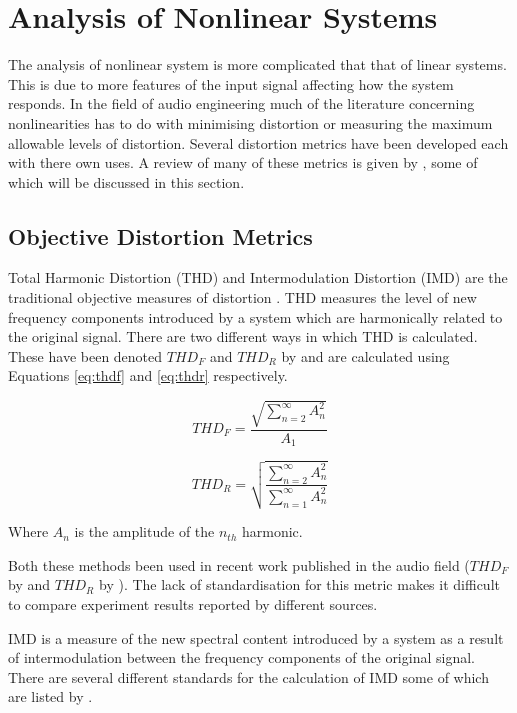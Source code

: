 \section{Analysis of Nonlinear Systems}
\label{sec:Excitation-AnalysisOfNonlinearSystems}
	The analysis of nonlinear system is more complicated that that of linear systems. This is due to more features of
	the input signal affecting how the system responds. In the field of audio engineering much of the literature
	concerning nonlinearities has to do with minimising distortion or measuring the maximum allowable levels of
	distortion. Several distortion metrics have been developed each with there own uses. A review of many of these
	metrics is given by \cite{voishvillo2006assessment}, some of which will be discussed in this section.

	\subsection{Objective Distortion Metrics}
	\label{sec:Excitation-Analysis-Metrics}
		Total Harmonic Distortion (THD) and Intermodulation Distortion (IMD) are the traditional objective measures
		of distortion \citep{czerwinski2001multitone1}. THD measures the level of new frequency components
		introduced by a system which are harmonically related to the original signal.  There are two different ways
		in which THD is calculated. These have been denoted $THD_{F}$ and $THD_{R}$ by \citet{shmilovitz2005on} and
		are calculated using Equations \ref{eq:thdf} and \ref{eq:thdr} respectively.

		\begin{equation}
			THD_{F} = \frac{\sqrt{\sum_{n = 2}^{\infty} A_{n}^{2}}}{A_{1}}
			\label{eq:thdf}
		\end{equation}

		\begin{equation}
			THD_{R} = \sqrt{\frac{\sum_{n = 2}^{\infty} A_{n}^{2}}{\sum_{n = 1}^{\infty} A_{n}^{2}}}
			\label{eq:thdr}
		\end{equation}

		Where $A_n$ is the amplitude of the $n_{th}$ harmonic. 

		Both these methods been used in recent work published in the audio field ($THD_{F}$ by
		\citet{fleischmann2014a} and $THD_{R}$ by \citet{dutilleux2011nonlinear}). The lack of standardisation for
		this metric makes it difficult to compare experiment results reported by different sources.

		IMD is a measure of the new spectral content introduced by a system as a result of intermodulation between
		the frequency components of the original signal. There are several different standards for the calculation
		of IMD some of which are listed by \citet{voishvillo2006assessment}.

